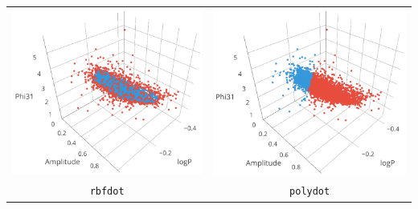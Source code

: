 \begin{longtable}{ c c }
	\includegraphics[width=0.3\paperwidth]{images/ksvm_rbfdot.png} & \includegraphics[width=0.3\paperwidth]{images/ksvm_polydot.png} \\
	\verb|rbfdot| & \verb|polydot| \\

\end{longtable}
